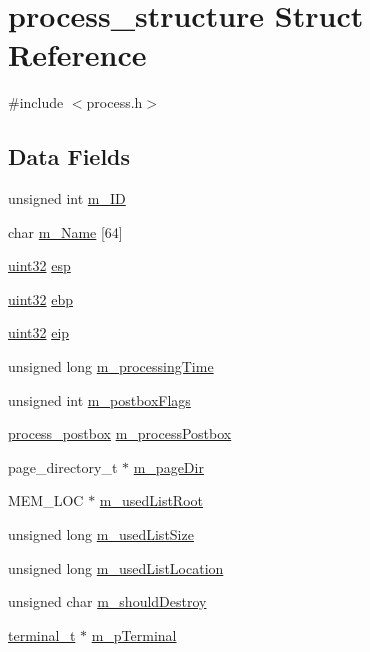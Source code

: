 \hypertarget{structprocess__structure}{
\section{process\_\-structure Struct Reference}
\label{structprocess__structure}
}


{\ttfamily \#include $<$process.h$>$}

\subsection*{Data Fields}
\begin{DoxyCompactItemize}
\item 
unsigned int \hyperlink{structprocess__structure_a224ebd60629fb6a835735e891c5ed665}{m\_\-ID}
\item 
char \hyperlink{structprocess__structure_ad48e1eeeebc30443de5b7de4a52e22c8}{m\_\-Name} \mbox{[}64\mbox{]}
\item 
\hyperlink{int__types_8h_a1134b580f8da4de94ca6b1de4d37975e}{uint32} \hyperlink{structprocess__structure_ab11061d99fc788d301f8a6602df30a07}{esp}
\item 
\hyperlink{int__types_8h_a1134b580f8da4de94ca6b1de4d37975e}{uint32} \hyperlink{structprocess__structure_a3fd20d68dc26771c688e272d96d44145}{ebp}
\item 
\hyperlink{int__types_8h_a1134b580f8da4de94ca6b1de4d37975e}{uint32} \hyperlink{structprocess__structure_a4267ae7974329fbe4e73475912fc2086}{eip}
\item 
unsigned long \hyperlink{structprocess__structure_a6f1bd4287fa411c20b741f5bd8dcdf48}{m\_\-processingTime}
\item 
unsigned int \hyperlink{structprocess__structure_aa847b634c602e55ae076b7c1eb60a12a}{m\_\-postboxFlags}
\item 
\hyperlink{structprocess__postbox}{process\_\-postbox} \hyperlink{structprocess__structure_a158668d142ff732572d4b738a0b7ba90}{m\_\-processPostbox}
\item 
page\_\-directory\_\-t $\ast$ \hyperlink{structprocess__structure_a696c6e2dc6799d60b208651eadbb1361}{m\_\-pageDir}
\item 
MEM\_\-LOC $\ast$ \hyperlink{structprocess__structure_a032625c34f249bf0321269843b0b529e}{m\_\-usedListRoot}
\item 
unsigned long \hyperlink{structprocess__structure_a542f16320981046ab3943e8c7ed46eab}{m\_\-usedListSize}
\item 
unsigned long \hyperlink{structprocess__structure_ab2dc0a220465f2bda420ac4cc053d88b}{m\_\-usedListLocation}
\item 
unsigned char \hyperlink{structprocess__structure_a3157fc938c803c37b84700905aadff90}{m\_\-shouldDestroy}
\item 
\hyperlink{structabstract__terminal}{terminal\_\-t} $\ast$ \hyperlink{structprocess__structure_a542c418055252b7dedef0c3589f322ca}{m\_\-pTerminal}
\end{DoxyCompactItemize}



